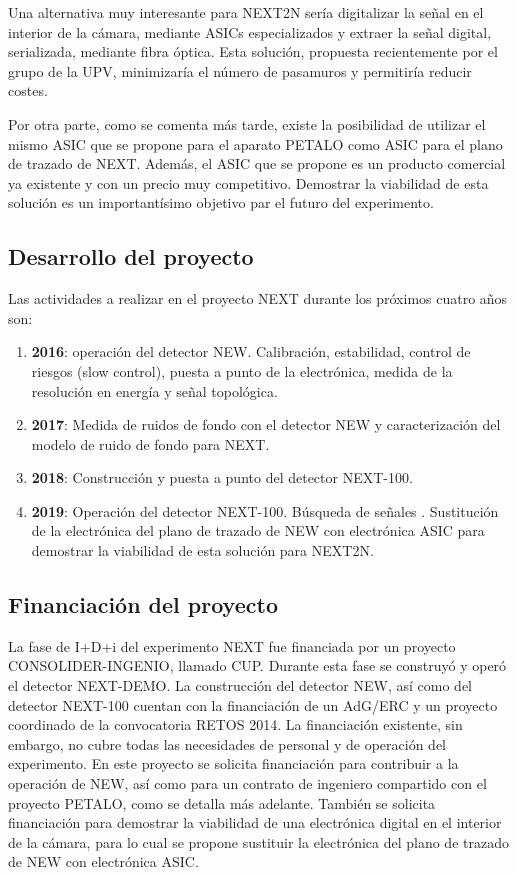 Una alternativa muy interesante para NEXT2N sería digitalizar la señal en el interior de la cámara, mediante ASICs especializados y extraer la señal digital, serializada, mediante fibra óptica. Esta solución, propuesta recientemente por el grupo de la UPV, minimizaría el número de pasamuros y permitiría reducir costes.

Por otra parte, como se comenta más tarde, existe la posibilidad de utilizar el mismo ASIC que se propone para el aparato PETALO como ASIC para el plano de trazado de NEXT. Además, el ASIC que se propone es un producto comercial ya existente y con un precio muy competitivo. Demostrar la viabilidad de esta solución es un importantísimo objetivo par el futuro del experimento. 


\subsection*{Desarrollo del proyecto}
Las actividades a realizar en el proyecto NEXT durante los próximos cuatro años son:
\begin{enumerate}
\item {\bf 2016}: operación del detector NEW. Calibración, estabilidad, control de riesgos (slow control), puesta a punto de la electrónica, medida de la resolución en energía y señal topológica.
\item {\bf 2017}: Medida de ruidos de fondo con el detector NEW y caracterización del modelo de ruido de fondo para NEXT. 
\item {\bf 2018}: Construcción y puesta a punto del detector NEXT-100. 
\item {\bf 2019}: Operación del detector NEXT-100. Búsqueda de señales \bbonu.  Sustitución de la electrónica del plano de trazado de NEW con electrónica ASIC para demostrar la viabilidad de esta solución para NEXT2N. 


\end{enumerate}

\subsection*{Financiación del proyecto}

La fase de I+D+i del experimento NEXT fue financiada por un proyecto CONSOLIDER-INGENIO, llamado CUP. Durante esta fase se construyó y operó el detector NEXT-DEMO. La construcción del detector NEW, así como del detector NEXT-100 cuentan con la financiación de un AdG/ERC y un proyecto coordinado de la convocatoria RETOS 2014. La financiación existente, sin embargo, no cubre todas las necesidades de personal y de operación del experimento. En este proyecto se solicita financiación para contribuir a la operación de NEW, así como para un contrato de ingeniero compartido con el proyecto PETALO, como se detalla más adelante. También se solicita financiación para demostrar la viabilidad de una electrónica digital en el interior de la cámara, para lo cual se propone sustituir la electrónica del plano de trazado de NEW con electrónica ASIC. 

